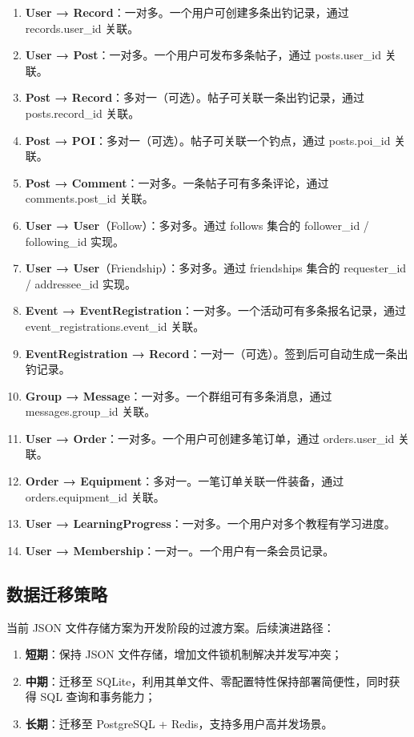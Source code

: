 \documentclass[12pt,a4paper]{ctexart}
\begin{document}
\begin{enumerate}
  \item \textbf{User → Record}：一对多。一个用户可创建多条出钓记录，通过 records.user\_id 关联。
  \item \textbf{User → Post}：一对多。一个用户可发布多条帖子，通过 posts.user\_id 关联。
  \item \textbf{Post → Record}：多对一（可选）。帖子可关联一条出钓记录，通过 posts.record\_id 关联。
  \item \textbf{Post → POI}：多对一（可选）。帖子可关联一个钓点，通过 posts.poi\_id 关联。
  \item \textbf{Post → Comment}：一对多。一条帖子可有多条评论，通过 comments.post\_id 关联。
  \item \textbf{User → User}（Follow）：多对多。通过 follows 集合的 follower\_id / following\_id 实现。
  \item \textbf{User → User}（Friendship）：多对多。通过 friendships 集合的 requester\_id / addressee\_id 实现。
  \item \textbf{Event → EventRegistration}：一对多。一个活动可有多条报名记录，通过 event\_registrations.event\_id 关联。
  \item \textbf{EventRegistration → Record}：一对一（可选）。签到后可自动生成一条出钓记录。
  \item \textbf{Group → Message}：一对多。一个群组可有多条消息，通过 messages.group\_id 关联。
  \item \textbf{User → Order}：一对多。一个用户可创建多笔订单，通过 orders.user\_id 关联。
  \item \textbf{Order → Equipment}：多对一。一笔订单关联一件装备，通过 orders.equipment\_id 关联。
  \item \textbf{User → LearningProgress}：一对多。一个用户对多个教程有学习进度。
  \item \textbf{User → Membership}：一对一。一个用户有一条会员记录。
\end{enumerate}

\subsection{数据迁移策略}

当前 JSON 文件存储方案为开发阶段的过渡方案。后续演进路径：
\begin{enumerate}
  \item \textbf{短期}：保持 JSON 文件存储，增加文件锁机制解决并发写冲突；
  \item \textbf{中期}：迁移至 SQLite，利用其单文件、零配置特性保持部署简便性，同时获得 SQL 查询和事务能力；
  \item \textbf{长期}：迁移至 PostgreSQL + Redis，支持多用户高并发场景。
\end{enumerate}
\end{document}
